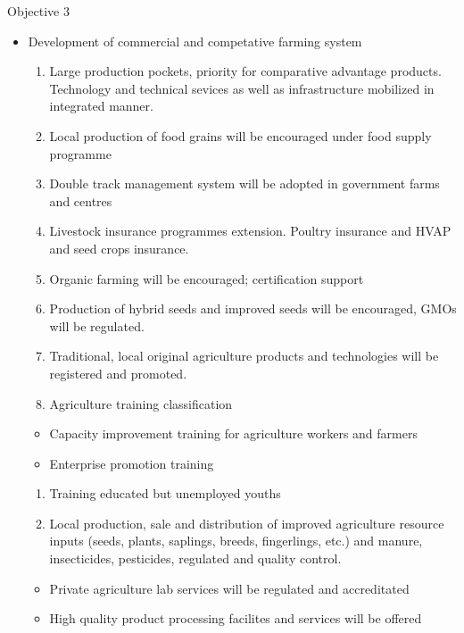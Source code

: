 \documentclass[
]{book}
\providecommand{\tightlist}{%
  \setlength{\itemsep}{0pt}\setlength{\parskip}{0pt}}
\begin{document}
Objective 3

\begin{itemize}
\tightlist
\item
  Development of commercial and competative farming system

  \begin{enumerate}
  \def\labelenumi{\arabic{enumi}.}
  \tightlist
  \item
    Large production pockets, priority for comparative advantage products. Technology and technical sevices as well as infrastructure mobilized in integrated manner.
  \item
    Local production of food grains will be encouraged under food supply programme
  \item
    Double track management system will be adopted in government farms and centres
  \item
    Livestock insurance programmes extension. Poultry insurance and HVAP and seed crops insurance.
  \item
    Organic farming will be encouraged; certification support
  \item
    Production of hybrid seeds and improved seeds will be encouraged, GMOs will be regulated.
  \item
    Traditional, local original agriculture products and technologies will be registered and promoted.
  \item
    Agriculture training classification
  \end{enumerate}

  \begin{itemize}
  \tightlist
  \item
    Capacity improvement training for agriculture workers and farmers
  \item
    Enterprise promotion training
  \end{itemize}

  \begin{enumerate}
  \def\labelenumi{\arabic{enumi}.}
  \setcounter{enumi}{8}
  \tightlist
  \item
    Training educated but unemployed youths
  \item
    Local production, sale and distribution of improved agriculture resource inputs (seeds, plants, saplings, breeds, fingerlings, etc.) and manure, insecticides, pesticides, regulated and quality control.
  \end{enumerate}

  \begin{itemize}
  \tightlist
  \item
    Private agriculture lab services will be regulated and accreditated
  \item
    High quality product processing facilites and services will be offered
  \end{itemize}


\end{itemize}
\end{document}
